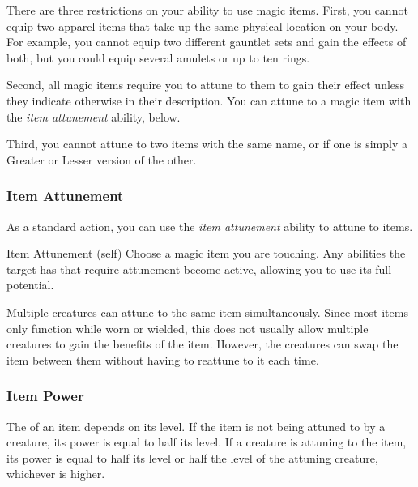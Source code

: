         There are three restrictions on your ability to use magic items.
        First, you cannot equip two apparel items that take up the same physical location on your body.
        For example, you cannot equip two different gauntlet sets and gain the effects of both, but you could equip several amulets or up to ten rings.

        Second, all magic items require you to attune to them to gain their effect unless they indicate otherwise in their description.
        You can attune to a magic item with the \textit{item attunement} ability, below.

        Third, you cannot attune to two items with the same name, or if one is simply a Greater or Lesser version of the other.

        \subsubsection{Item Attunement}\label{Item Attunement}

            As a standard action, you can use the \textit{item attunement} ability to attune to items.

            \begin{attuneability}{Item Attunement}
                 (self)
                \rankline
                Choose a magic item you are touching.
                Any abilities the target has that require attunement become active, allowing you to use its full potential.
            \end{attuneability}

             Multiple creatures can attune to the same item simultaneously.
            Since most items only function while worn or wielded, this does not usually allow multiple creatures to gain the benefits of the item.
            However, the creatures can swap the item between them without having to reattune to it each time.

    \subsubsection{Item Power}\label{Item Power}
        The  of an item depends on its level.
        If the item is not being attuned to by a creature, its power is equal to half its level.
        If a creature is attuning to the item, its power is equal to half its level or half the level of the attuning creature, whichever is higher.

